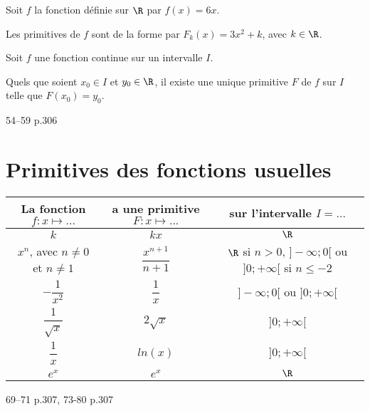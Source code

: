 \documentclass[a4paper]{article}
\begin{document}
\begin{example*}{}{}
  Soit $f$ la fonction définie sur $\R$ par $f(x)=6x$.
  
  Les primitives de $f$ sont de la forme par $F_k(x)=3x^2+k$, avec $k\in\R$.
\end{example*}

\begin{propriete*}{}{}
Soit $f$ une fonction continue sur un intervalle $I$.

Quels que soient $x_0 \in I$ et $y_0 \in \R$, il existe une unique primitive $F$ de $f$ sur $I$ telle que $F(x_0)=y_0$.
\end{propriete*}

\begin{exercices}{}{}
54--59 p.306
\end{exercices}

\section{Primitives des fonctions usuelles}


\begin{propriete}{}{}
  \begin{center}
    \renewcommand\arraystretch{2}
    \begin{tabular}{|c|c|c|}
      \hline
      La fonction $f:x\longmapsto ... $ &  a une primitive $F:x\longmapsto ...$ & sur l'intervalle $I=...$\\
       \hline
        $k$ & $kx$ & $\R$ \\
       \hline
       $x^n$, avec $n\neq0$ et $n\neq 1$ & $\dfrac{x^{n+1}}{n+1}$ & $\R$ si $n>0$, $]-\infty;0[$ ou $]0;+\infty[$ si $n\leqslant -2$ \\
       \hline
        $-\dfrac{1}{x^2}$ & $\dfrac{1}{x}$ & $]-\infty;0[$ ou $]0;+\infty[$ \\
       \hline
       $\dfrac{1}{\sqrt{x}}$ & $2\sqrt{x}$ & $]0;+\infty[$ \\
       \hline
       $\dfrac{1}{x}$ & $ln(x)$ & $]0;+\infty[$ \\
       \hline
       $e^x$ & $e^x$ & $\R$ \\
       \hline     
  \end{tabular}
  \end{center}
\end{propriete}

\begin{exercices}{}{}
  69--71 p.307,  73-80 p.307
\end{exercices}
\end{document}
